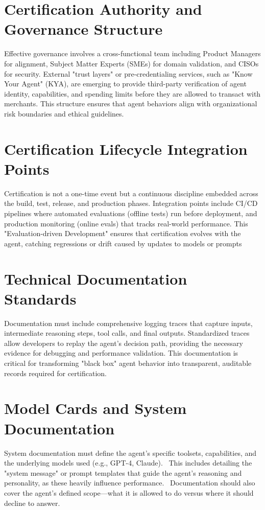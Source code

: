 \begin{TNtwocol}
\section{Certification Authority and Governance Structure}
Effective governance involves a cross-functional team including Product Managers for alignment, Subject Matter Experts (SMEs) for domain validation, and CISOs for security. External "trust layers" or pre-credentialing services, such as "Know Your Agent" (KYA), are emerging to provide third-party verification of agent identity, capabilities, and spending limits before they are allowed to transact with merchants. This structure ensures that agent behaviors align with organizational risk boundaries and ethical guidelines.
\section{Certification Lifecycle Integration Points}
Certification is not a one-time event but a continuous discipline embedded across the build, test, release, and production phases. Integration points include CI/CD pipelines where automated evaluations (offline tests) run before deployment, and production monitoring (online evals) that tracks real-world performance. This "Evaluation-driven Development" ensures that certification evolves with the agent, catching regressions or drift caused by updates to models or prompts
\section{Technical Documentation Standards}
Documentation must include comprehensive logging traces that capture inputs, intermediate reasoning steps, tool calls, and final outputs. Standardized traces allow developers to replay the agent's decision path, providing the necessary evidence for debugging and performance validation. This documentation is critical for transforming "black box" agent behavior into transparent, auditable records required for certification.~\cite{huggingface2024}
\section{Model Cards and System Documentation}
System documentation must define the agent's specific toolsets, capabilities, and the underlying models used (e.g., GPT-4, Claude).~\cite{langchain2024} This includes detailing the "system message" or prompt templates that guide the agent's reasoning and personality, as these heavily influence performance.~\cite{deepeval_ai_agent_evaluation} Documentation should also cover the agent's defined scope—what it is allowed to do versus where it should decline to answer.

\end{TNtwocol}
